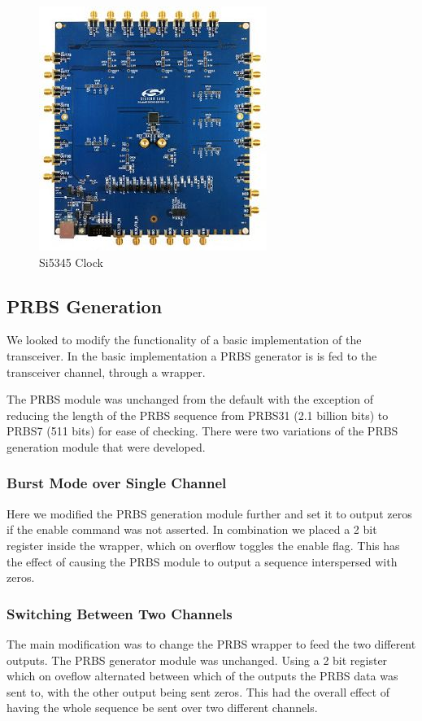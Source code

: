 \begin{figure}[ht]
    \centering
    \includegraphics[width=0.4\linewidth]{img/clock.jpg}
    \caption{Si5345 Clock}%
    \label{fig:clock}
\end{figure}

\subsection{PRBS Generation}%
\label{sub:prbs_generation}

We looked to modify the functionality of a basic implementation of the
transceiver. In the basic implementation a PRBS generator is is fed to the
transceiver channel, through a wrapper. 

The PRBS module was unchanged from the default with the exception of reducing
the length of the PRBS sequence from PRBS31 (2.1 billion bits) to PRBS7 (511
bits) for ease of checking.
There were two variations of the PRBS generation module that were developed.

\subsubsection{Burst Mode over Single Channel}%
\label{ssub:burst_mode_over_single_channel}
Here we modified the PRBS generation module further and set it to output zeros
if the enable command was not asserted.  In combination we placed a 2 bit register inside
the wrapper, which on overflow toggles the enable flag. This has the effect of
causing the PRBS module to output a sequence interspersed with zeros.


\subsubsection{Switching Between Two Channels}%
\label{ssub:switching_between_two_channels}
The main modification was to change the PRBS wrapper to feed the two different
outputs. The PRBS generator module was unchanged. Using a 2 bit register which
on oveflow alternated between which of the outputs the PRBS data was sent to, with
the other output being sent zeros. This had the overall effect of having the
whole sequence be sent over two different channels.

